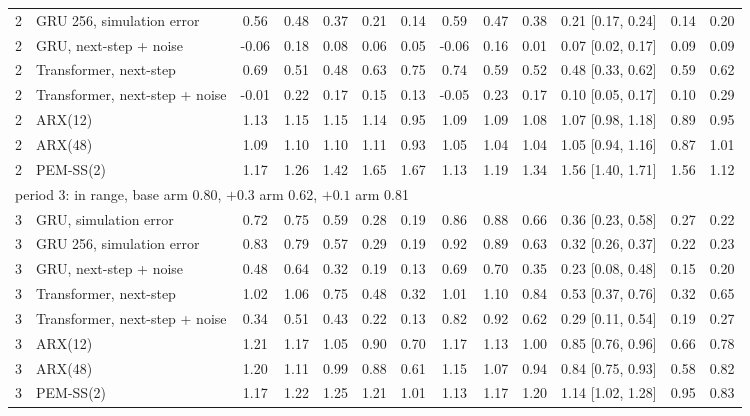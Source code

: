 \documentclass[11pt]{article}
\begin{document}
\begin{center}
{\begin{tabular}{llccccccccccc}
2 & GRU 256, simulation error & 0.56 & 0.48 & 0.37 & 0.21 & 0.14 & 0.59 & 0.47 & 0.38 & 0.21 [0.17, 0.24] & 0.14 & 0.20\\
2 & GRU, next-step + noise & -0.06 & 0.18 & 0.08 & 0.06 & 0.05 & -0.06 & 0.16 & 0.01 & 0.07 [0.02, 0.17] & 0.09 & 0.09\\
2 & Transformer, next-step & 0.69 & 0.51 & 0.48 & 0.63 & 0.75 & 0.74 & 0.59 & 0.52 & 0.48 [0.33, 0.62] & 0.59 & 0.62\\
2 & Transformer, next-step + noise & -0.01 & 0.22 & 0.17 & 0.15 & 0.13 & -0.05 & 0.23 & 0.17 & 0.10 [0.05, 0.17] & 0.10 & 0.29\\
2 & ARX(12) & 1.13 & 1.15 & 1.15 & 1.14 & 0.95 & 1.09 & 1.09 & 1.08 & 1.07 [0.98, 1.18] & 0.89 & 0.95\\
2 & ARX(48) & 1.09 & 1.10 & 1.10 & 1.11 & 0.93 & 1.05 & 1.04 & 1.04 & 1.05 [0.94, 1.16] & 0.87 & 1.01\\
2 & PEM-SS(2) & 1.17 & 1.26 & 1.42 & 1.65 & 1.67 & 1.13 & 1.19 & 1.34 & 1.56 [1.40, 1.71] & 1.56 & 1.12\\
\multicolumn{13}{l}{period 3: in range, base arm 0.80, $+0.3$ arm 0.62, $+0.1$ arm 0.81}\\
3 & GRU, simulation error & 0.72 & 0.75 & 0.59 & 0.28 & 0.19 & 0.86 & 0.88 & 0.66 & 0.36 [0.23, 0.58] & 0.27 & 0.22\\
3 & GRU 256, simulation error & 0.83 & 0.79 & 0.57 & 0.29 & 0.19 & 0.92 & 0.89 & 0.63 & 0.32 [0.26, 0.37] & 0.22 & 0.23\\
3 & GRU, next-step + noise & 0.48 & 0.64 & 0.32 & 0.19 & 0.13 & 0.69 & 0.70 & 0.35 & 0.23 [0.08, 0.48] & 0.15 & 0.20\\
3 & Transformer, next-step & 1.02 & 1.06 & 0.75 & 0.48 & 0.32 & 1.01 & 1.10 & 0.84 & 0.53 [0.37, 0.76] & 0.32 & 0.65\\
3 & Transformer, next-step + noise & 0.34 & 0.51 & 0.43 & 0.22 & 0.13 & 0.82 & 0.92 & 0.62 & 0.29 [0.11, 0.54] & 0.19 & 0.27\\
3 & ARX(12) & 1.21 & 1.17 & 1.05 & 0.90 & 0.70 & 1.17 & 1.13 & 1.00 & 0.85 [0.76, 0.96] & 0.66 & 0.78\\
3 & ARX(48) & 1.20 & 1.11 & 0.99 & 0.88 & 0.61 & 1.15 & 1.07 & 0.94 & 0.84 [0.75, 0.93] & 0.58 & 0.82\\
3 & PEM-SS(2) & 1.17 & 1.22 & 1.25 & 1.21 & 1.01 & 1.13 & 1.17 & 1.20 & 1.14 [1.02, 1.28] & 0.95 & 0.83\\
\bottomrule\end{tabular}}\end{center}
\end{document}
